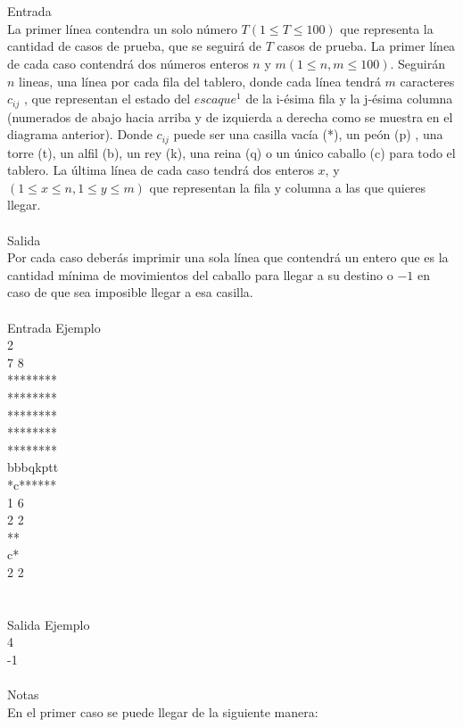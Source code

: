 \documentclass[12pt]{article}
\begin{document}
{{{\\
\\
\textrm{\large Entrada}
\\
La primer línea contendra un solo número $T (1 ≤ T ≤ 100)$ que representa la cantidad de casos de prueba, que se seguirá de $T$ casos de prueba. La primer línea de cada caso contendrá dos números enteros $n$ y $m (1 ≤ n, m ≤ 100)$. Seguirán $n$ lineas, una línea por cada fila del tablero, donde cada línea tendrá $m$ caracteres $c_{ij}$ , que representan el estado del $escaque^1$ de la i-ésima fila y la j-ésima columna (numerados de abajo hacia arriba y de izquierda a derecha como se muestra en el diagrama anterior). Donde $c_{ij}$ puede ser una casilla vacía (*), un peón (p) , una torre (t), un alfil (b), un rey (k), una reina (q) o un único caballo (c) para todo el tablero. La última línea de cada caso tendrá dos enteros $x$, y $(1 ≤ x ≤ n, 1 ≤ y ≤ m)$ que representan la fila y columna a las que quieres llegar.
\\
\\
\textrm{\large Salida}
\\
Por cada caso deberás imprimir una sola línea que contendrá un entero que es la cantidad mínima de movimientos del caballo para llegar a su destino o $-1$ en caso de que sea imposible llegar a esa casilla.
\\
\\
\textrm{\large Entrada Ejemplo}
\\
2\\
7 8\\
********\\
********\\
********\\
********\\
********\\
bbbqkptt\\
*c******\\
1 6\\
2 2\\
**\\
c*\\
2 2\\
\\
\\
\textrm{\large Salida Ejemplo}
\\
4\\
-1\\
\\Notas
\\En el primer caso se puede llegar de la siguiente manera:
\begin{figure}[h!] 

\end{figure}}}}
\end{document}
